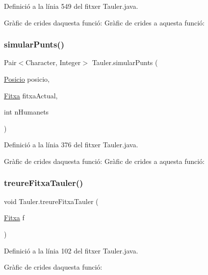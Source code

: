 Definició a la línia 549 del fitxer Tauler.\+java.

Gràfic de crides d\textquotesingle{}aquesta funció\+:
Gràfic de crides a aquesta funció\+:
\mbox{\label{class_tauler_a0a7e35375e0863e69cbb531232fcc3ce}} 
\subsubsection{\texorpdfstring{simular\+Punts()}{simularPunts()}}
{\footnotesize\ttfamily Pair$<$Character, Integer$>$ Tauler.\+simular\+Punts (\begin{DoxyParamCaption}\item[{\mbox{\hyperlink{class_posicio}{Posicio}}}]{posicio,  }\item[{\mbox{\hyperlink{class_fitxa}{Fitxa}}}]{fitxa\+Actual,  }\item[{int}]{n\+Humanets }\end{DoxyParamCaption})}



Definició a la línia 376 del fitxer Tauler.\+java.

Gràfic de crides d\textquotesingle{}aquesta funció\+:
Gràfic de crides a aquesta funció\+:
\mbox{\label{class_tauler_ad52694ab07b38f083c68d119701a72c8}} 
\subsubsection{\texorpdfstring{treure\+Fitxa\+Tauler()}{treureFitxaTauler()}}
{\footnotesize\ttfamily void Tauler.\+treure\+Fitxa\+Tauler (\begin{DoxyParamCaption}\item[{\mbox{\hyperlink{class_fitxa}{Fitxa}}}]{f }\end{DoxyParamCaption})}



Definició a la línia 102 del fitxer Tauler.\+java.

Gràfic de crides d\textquotesingle{}aquesta funció\+:
\mbox{\label{class_tauler_acc18f6c54b9a7c0748a20a2090c76252}} 
